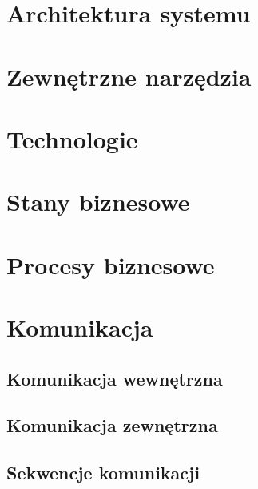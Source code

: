 \documentclass[../praca-dyplomowa.tex]{subfiles}
\begin{document}
\section{Architektura systemu}
\label{architecture}


\section{Zewnętrzne narzędzia}


\section{Technologie}



\section{Stany biznesowe}

\section{Procesy biznesowe}

\section{Komunikacja}

\subsection{Komunikacja wewnętrzna}

\subsection{Komunikacja zewnętrzna}

\subsection{Sekwencje komunikacji}

\end{document}
